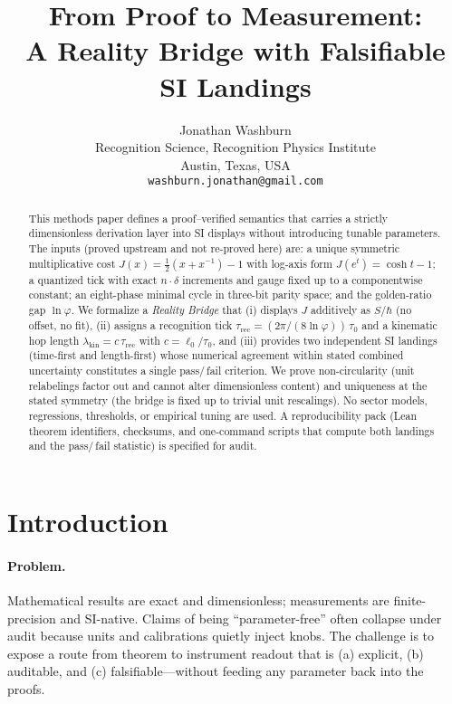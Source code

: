 \documentclass[11pt]{article}
\title{From Proof to Measurement:\\
A Reality Bridge with Falsifiable SI Landings}
\author{Jonathan Washburn\\
Recognition Science, Recognition Physics Institute\\
Austin, Texas, USA\\
\texttt{washburn.jonathan@gmail.com}}
\date{} %
\theoremstyle{plain}
\theoremstyle{definition}
\theoremstyle{remark}
\begin{document}
\maketitle

\begin{abstract}
This methods paper defines a proof–verified semantics that carries a strictly dimensionless derivation layer into SI displays without introducing tunable parameters. The inputs (proved upstream and not re-proved here) are: a unique symmetric multiplicative cost \(J(x)=\tfrac12(x+x^{-1})-1\) with log-axis form \(J(e^{t})=\cosh t-1\); a quantized tick with exact \(n\cdot\delta\) increments and gauge fixed up to a componentwise constant; an eight-phase minimal cycle in three-bit parity space; and the golden-ratio gap \(\ln\varphi\). We formalize a \emph{Reality Bridge} that (i) displays \(J\) additively as \(S/\hbar\) (no offset, no fit), (ii) assigns a recognition tick \(\tau_{\mathrm{rec}}=(2\pi/(8\ln\varphi))\,\tau_{0}\) and a kinematic hop length \(\lambda_{\mathrm{kin}}=c\,\tau_{\mathrm{rec}}\) with \(c=\ell_{0}/\tau_{0}\), and (iii) provides two independent SI landings (time-first and length-first) whose numerical agreement within stated combined uncertainty constitutes a single pass/\,fail criterion. We prove non-circularity (unit relabelings factor out and cannot alter dimensionless content) and uniqueness at the stated symmetry (the bridge is fixed up to trivial unit rescalings). No sector models, regressions, thresholds, or empirical tuning are used. A reproducibility pack (Lean theorem identifiers, checksums, and one-command scripts that compute both landings and the pass/\,fail statistic) is specified for audit.
\end{abstract}

\section{Introduction}
\paragraph{Problem.}
Mathematical results are exact and dimensionless; measurements are finite-precision and SI-native. Claims of being “parameter-free” often collapse under audit because units and calibrations quietly inject knobs. The challenge is to expose a route from theorem to instrument readout that is (a) explicit, (b) auditable, and (c) falsifiable—without feeding any parameter back into the proofs.
\end{document}
